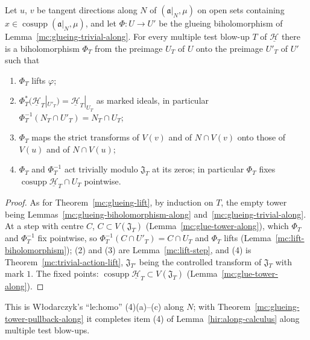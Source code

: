 \begin{theorem}
\label{mc:glueing-lift-along}
\leanok
Let \(u\), \(v\) be tangent directions along \(N\) of \((\mathfrak a|_N,\mu)\) on open sets containing \(x\in\operatorname{cosupp}(\mathfrak a|_N,\mu)\), and let \(\Phi\colon U\to U'\)
be the glueing biholomorphism of Lemma~\ref{mc:glueing-trivial-along}. For every multiple test blow-up \(T\) of \(\underline{\mathcal H}\) there is a biholomorphism
\(\Phi_T\) from the preimage \(U_T\) of \(U\) onto the preimage \(U'_T\) of \(U'\) such that
\begin{enumerate}
\item \(\Phi_T\) lifts \(\varphi\);
\item \(\Phi_T^*(\underline{\mathcal H}_T|_{U'_T})=\underline{\mathcal H}_T|_{U_T}\) as marked ideals, in particular \(\Phi_T^{-1}(N_T\cap U'_T)=N_T\cap U_T\);
\item \(\Phi_T\) maps the strict transforms of \(V(v)\) and of \(N\cap V(v)\) onto those of \(V(u)\) and of \(N\cap V(u)\);
\item \(\Phi_T\) and \(\Phi_T^{-1}\) act trivially modulo \(\mathfrak J_T\) at its zeros; in particular \(\Phi_T\) fixes \(\operatorname{cosupp}\underline{\mathcal H}_T\cap U_T\) pointwise.
\end{enumerate}
\end{theorem}
\begin{proof}
\leanok
As for Theorem~\ref{mc:glueing-lift}, by induction on \(T\), the empty tower being Lemmas~\ref{mc:glueing-biholomorphism-along} and~\ref{mc:glueing-trivial-along}.
At a step with centre \(C\), \(C\subset V(\mathfrak J_T)\) (Lemma~\ref{mc:glue-tower-along}), which \(\Phi_T\) and \(\Phi_T^{-1}\) fix pointwise, so
\(\Phi_T^{-1}(C\cap U'_T)=C\cap U_T\) and \(\Phi_T\) lifts (Lemma~\ref{mc:lift-biholomorphism}); (2) and (3) are Lemma~\ref{mc:lift-step}, and (4) is
Theorem~\ref{mc:trivial-action-lift}, \(\mathfrak J_{T'}\) being the controlled transform of \(\mathfrak J_T\) with mark \(1\). The fixed points:
\(\operatorname{cosupp}\underline{\mathcal H}_T\subset V(\mathfrak J_T)\) (Lemma~\ref{mc:glue-tower-along}).
\end{proof}
This is Włodarczyk's ``le:homo'' (4)(a)--(c) along \(N\); with Theorem~\ref{mc:glueing-tower-pullback-along} it completes item (4) of Lemma~\ref{hir:along-calculus}
along multiple test blow-ups.

